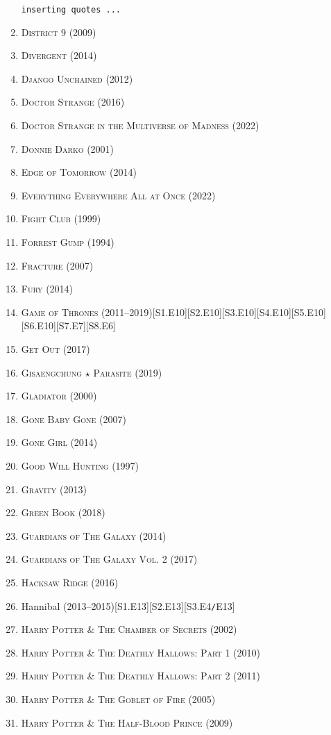 \documentclass[oneside]{book}
\numberwithin{equation}{section}
\begin{document}
\begin{enumerate}
	\texttt{inserting quotes ...}
	\item \textsc{District 9} (2009)
	\item \textsc{Divergent} (2014)
	\item \textsc{Django Unchained} (2012)
	\item \textsc{Doctor Strange} (2016)
	\item \textsc{Doctor Strange in the Multiverse of Madness} (2022)
	\item \textsc{Donnie Darko} (2001)
	\item \textsc{Edge of Tomorrow} (2014)
	\item \textsc{Everything Everywhere All at Once} (2022)
	\item \textsc{Fight Club} (1999)
	\item \textsc{Forrest Gump} (1994)
	\item \textsc{Fracture} (2007)
	\item \textsc{Fury} (2014)
	\item \textsc{Game of Thrones} (2011--2019)\hfill[S1.E10][S2.E10][S3.E10][S4.E10][S5.E10][S6.E10][S7.E7][S8.E6]
	\item \textsc{Get Out} (2017)
	\item \textsc{Gisaengchung $\star$ Parasite} (2019)
	\item \textsc{Gladiator} (2000)
	\item \textsc{Gone Baby Gone} (2007)
	\item \textsc{Gone Girl} (2014)
	\item \textsc{Good Will Hunting} (1997)
	\item \textsc{Gravity} (2013)
	\item \textsc{Green Book} (2018)
	\item \textsc{Guardians of The Galaxy} (2014)
	\item \textsc{Guardians of The Galaxy Vol. 2} (2017)
	\item \textsc{Hacksaw Ridge} (2016)
	\item Hannibal (2013--2015)\hfill[S1.E13][S2.E13][S3.E4\texttt{/}E13]
	\item \textsc{Harry Potter \& The Chamber of Secrets} (2002)
	\item \textsc{Harry Potter \& The Deathly Hallows: Part 1} (2010)
	\item \textsc{Harry Potter \& The Deathly Hallows: Part 2} (2011)
	\item \textsc{Harry Potter \& The Goblet of Fire} (2005)
	\item \textsc{Harry Potter \& The Half-Blood Prince} (2009)

\end{enumerate}
\end{document}
